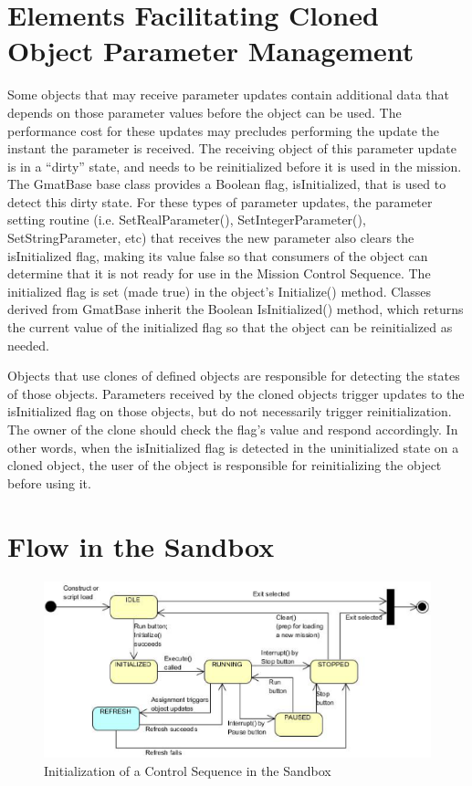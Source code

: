\documentclass[10pt,letterpaper]{article}
\begin{document}
\section{Elements Facilitating Cloned Object Parameter Management}

Some objects that may receive parameter updates contain additional data that depends on those parameter values before the object can be used.  The performance cost for these updates may precludes performing the update the instant the parameter is received.  The receiving object of this parameter update is in a ``dirty'' state, and needs to be reinitialized before it is used in the mission.  The GmatBase base class provides a Boolean flag, isInitialized, that is used to detect this dirty state.  For these types of parameter updates, the parameter setting routine (i.e. SetRealParameter(), SetIntegerParameter(), SetStringParameter, etc) that receives the new parameter also clears the isInitialized flag, making its value false so that consumers of the object can determine that it is not ready for use in the Mission Control Sequence.  The initialized flag is set (made true) in the object's Initialize() method.  Classes derived from GmatBase inherit the Boolean IsInitialized() method, which returns the current value of the initialized flag so that the object can be reinitialized as needed. 

Objects that use clones of defined objects are responsible for detecting the states of those objects.  Parameters received by the cloned objects trigger updates to the isInitialized flag on those objects, but do not necessarily trigger reinitialization.  The owner of the clone should check the flag's value and respond accordingly.  In other words, when the isInitialized flag is detected in the uninitialized state on a cloned object, the user of the object is responsible for reinitializing the object before using it.

\section{Flow in the Sandbox}

\begin{figure}[htb]
\begin{center}
\includegraphics[scale=0.65]{Images/SandboxStateTransitions-updated.eps}
\caption{\label{figure:SandboxStates}Initialization of a Control Sequence in the Sandbox}
\end{center}
\end{figure}
\end{document}
